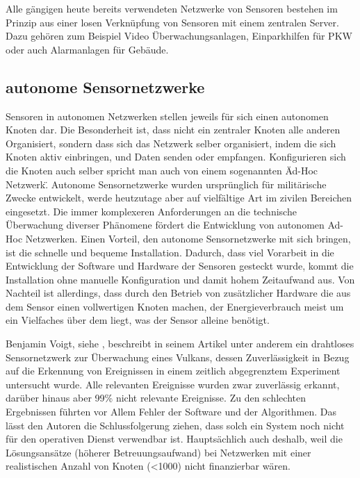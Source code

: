 Alle gängigen heute bereits verwendeten Netzwerke von Sensoren bestehen im Prinzip aus einer losen Verknüpfung von Sensoren mit einem zentralen Server. Dazu gehören zum Beispiel Video Überwachungsanlagen, Einparkhilfen für PKW oder auch Alarmanlagen für Gebäude.

\subsection{autonome Sensornetzwerke}
Sensoren in autonomen Netzwerken stellen jeweils für sich einen autonomen Knoten dar. Die Besonderheit ist, dass nicht ein zentraler Knoten alle anderen Organisiert, sondern dass sich das Netzwerk selber organisiert, indem die sich Knoten aktiv einbringen, und Daten senden oder empfangen. Konfigurieren sich die Knoten auch selber spricht man auch von einem sogenannten \"Ad-Hoc Netzwerk\". Autonome Sensornetzwerke wurden ursprünglich für militärische Zwecke entwickelt, werde heutzutage aber auf vielfältige Art im zivilen Bereichen eingesetzt. Die immer komplexeren Anforderungen an die technische Überwachung diverser Phänomene fördert die Entwicklung von autonomen Ad-Hoc Netzwerken. Einen Vorteil, den autonome Sensornetzwerke mit sich bringen, ist die schnelle und bequeme Installation. Dadurch, dass viel Vorarbeit in die Entwicklung der Software und Hardware der Sensoren gesteckt wurde, kommt die Installation ohne manuelle Konfiguration und damit hohem Zeitaufwand aus. Von Nachteil ist allerdings, dass durch den Betrieb von zusätzlicher Hardware die aus dem Sensor einen vollwertigen Knoten machen, der Energieverbrauch meist um ein Vielfaches über dem liegt, was der Sensor alleine benötigt. \citep{voigt_illustration_2013} \citep{akyildiz_survey_2002} \citep{vieira_survey_2003} \citep{resch_standardisierte_2012}

Benjamin Voigt, siehe \citep{voigt_illustration_2013}, beschreibt in seinem Artikel unter anderem ein drahtloses Sensornetzwerk zur Überwachung eines Vulkans, dessen Zuverlässigkeit in Bezug auf die Erkennung von Ereignissen in einem zeitlich abgegrenztem Experiment untersucht wurde. Alle relevanten Ereignisse wurden zwar zuverlässig erkannt, darüber hinaus aber 99\%  nicht relevante Ereignisse. Zu den schlechten Ergebnissen führten vor Allem Fehler der Software und der Algorithmen. Das lässt den Autoren die Schlussfolgerung ziehen, dass solch ein System noch nicht für den operativen Dienst verwendbar ist. Hauptsächlich auch deshalb, weil die Lösungsansätze (höherer Betreuungsaufwand) bei Netzwerken mit einer realistischen Anzahl von Knoten (<1000) nicht finanzierbar wären.


